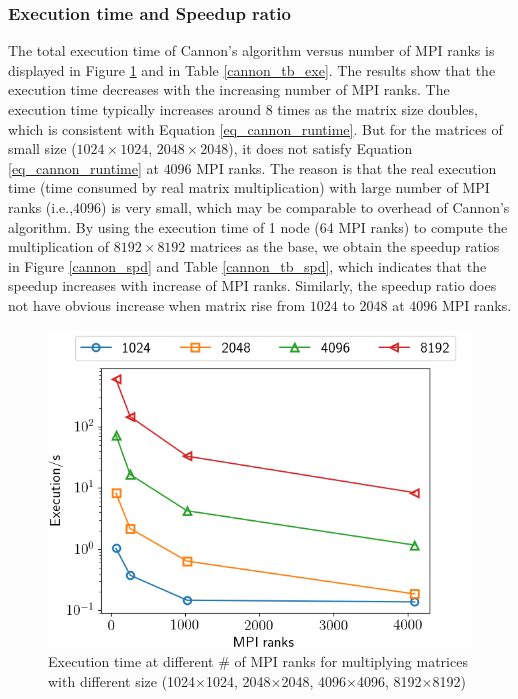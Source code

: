 \documentclass[conference]{IEEEtran}
\begin{document}
\subsubsection{Execution time and Speedup ratio}
The total execution time of Cannon's algorithm versus number of MPI ranks is displayed in Figure \ref{cannon_exe} and in Table \ref{cannon_tb_exe}. The results show that the execution time decreases with the increasing number of MPI ranks. The execution time typically increases around 8 times as the matrix size doubles, which is consistent with Equation \ref{eq_cannon_runtime}. But for the matrices of small size ($1024\times1024$, $2048 \times 2048$), it does not satisfy Equation \ref{eq_cannon_runtime} at $4096$ MPI ranks. The reason is that the real execution time (time consumed by real matrix multiplication) with large number of MPI ranks (i.e.,$4096$) is very small, which may be comparable to overhead of Cannon's algorithm. By using the execution time of 1 node (64 MPI ranks) to compute the multiplication of $8192\times8192$ matrices as the base, we obtain the speedup ratios in Figure \ref{cannon_spd} and Table \ref{cannon_tb_spd}, which indicates that the speedup increases with increase of MPI ranks. Similarly, the speedup ratio does not have obvious increase when matrix rise from $1024$ to $2048$ at $4096$ MPI ranks. 
\begin{figure}[!h]
    \centering
    \includegraphics[scale=0.4]{Figures/cannon/execution_vs_ranks.png}
    \caption{ Execution time at different \# of MPI ranks for multiplying matrices with different size (1024$\times$1024, 2048$\times$2048, 4096$\times$4096, 8192$\times$8192)}
    \label{cannon_exe}
\end{figure}
\end{document}
